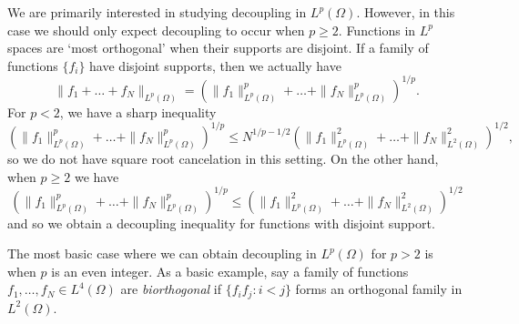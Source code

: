 %
%

\begin{remark}
  We are primarily interested in studying decoupling in $L^p(\Omega)$. However, in this case we should only expect decoupling to occur when $p \geq 2$. Functions in $L^p$ spaces are `most orthogonal' when their supports are disjoint. If a family of functions $\{ f_i \}$ have disjoint supports, then we actually have
  \[ \| f_1 + \dots + f_N \|_{L^p(\Omega)} = \left( \| f_1 \|_{L^p(\Omega)}^p + \dots + \| f_N \|_{L^p(\Omega)}^p \right)^{1/p}. \]
  For $p < 2$, we have a sharp inequality
  \[ \left( \| f_1 \|_{L^p(\Omega)}^p + \dots + \| f_N \|_{L^p(\Omega)}^p \right)^{1/p} \leq N^{1/p - 1/2} \left( \| f_1 \|_{L^p(\Omega)}^2 + \dots + \| f_N \|_{L^2(\Omega)}^2 \right)^{1/2}, \]
  so we do not have square root cancelation in this setting. On the other hand, when $p \geq 2$ we have
  \[ \left( \| f_1 \|_{L^p(\Omega)}^p + \dots + \| f_N \|_{L^p(\Omega)}^p \right)^{1/p} \leq \left( \| f_1 \|_{L^p(\Omega)}^2 + \dots + \| f_N \|_{L^2(\Omega)}^2 \right)^{1/2} \]
  and so we obtain a decoupling inequality for functions with disjoint support.
\end{remark}

The most basic case where we can obtain decoupling in $L^p(\Omega)$ for $p > 2$ is when $p$ is an even integer. As a basic example, say a family of functions $f_1, \dots, f_N \in L^4(\Omega)$ are \emph{biorthogonal} if $\{ f_i f_j : i < j \}$ forms an orthogonal family in $L^2(\Omega)$.

